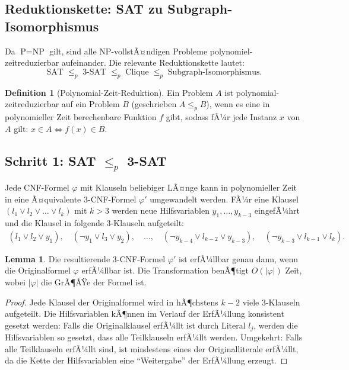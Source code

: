 ﻿\documentclass[a4paper,12pt]{article}
\theoremstyle{definition}
\newtheorem{definition}{Definition}
\newtheorem{lemma}{Lemma}
\begin{document}
\subsection{Reduktionskette: SAT zu Subgraph-Isomorphismus}

Da $\text{P} = \text{NP}$ gilt, sind alle NP-vollstÃ¤ndigen Probleme polynomiel-zeitreduzierbar aufeinander. Die relevante Reduktionskette lautet:
\[
\text{SAT} \;\leq_p\; \text{3-SAT} \;\leq_p\; \text{Clique} \;\leq_p\; \text{Subgraph-Isomorphismus}.
\]

\begin{definition}[Polynomial-Zeit-Reduktion]
    Ein Problem $A$ ist polynomial-zeitreduzierbar auf ein Problem $B$ (geschrieben $A \leq_p B$), wenn es eine in polynomieller Zeit berechenbare Funktion $f$ gibt, sodass fÃ¼r jede Instanz $x$ von $A$ gilt: $x \in A \Leftrightarrow f(x) \in B$.
\end{definition}

\subsection{Schritt 1: SAT $\leq_p$ 3-SAT}

Jede CNF-Formel $\varphi$ mit Klauseln beliebiger LÃ¤nge kann in polynomieller Zeit in eine Ã¤quivalente 3-CNF-Formel $\varphi'$ umgewandelt werden. FÃ¼r eine Klausel $(l_1 \lor l_2 \lor \ldots \lor l_k)$ mit $k > 3$ werden neue Hilfsvariablen $y_1, \ldots, y_{k-3}$ eingefÃ¼hrt und die Klausel in folgende 3-Klauseln aufgeteilt:
\begin{align*}
    (l_1 \lor l_2 \lor y_1), \quad
    (\neg y_1 \lor l_3 \lor y_2), \quad
    \ldots, \quad
    (\neg y_{k-4} \lor l_{k-2} \lor y_{k-3}), \quad
    (\neg y_{k-3} \lor l_{k-1} \lor l_k).
\end{align*}

\begin{lemma}
    Die resultierende 3-CNF-Formel $\varphi'$ ist erfÃ¼llbar genau dann, wenn die Originalformel $\varphi$ erfÃ¼llbar ist. Die Transformation benÃ¶tigt $O(|\varphi|)$ Zeit, wobei $|\varphi|$ die GrÃ¶ÃŸe der Formel ist.
\end{lemma}

\begin{proof}
    Jede Klausel der Originalformel wird in hÃ¶chstens $k - 2$ viele 3-Klauseln aufgeteilt. Die Hilfsvariablen kÃ¶nnen im Verlauf der ErfÃ¼llung konsistent gesetzt werden: Falls die Originalklausel erfÃ¼llt ist durch Literal $l_j$, werden die Hilfsvariablen so gesetzt, dass alle Teilklauseln erfÃ¼llt werden. Umgekehrt: Falls alle Teilklauseln erfÃ¼llt sind, ist mindestens eines der Originalliterale erfÃ¼llt, da die Kette der Hilfsvariablen eine ``Weitergabe'' der ErfÃ¼llung erzeugt.
\end{proof}
\end{document}
